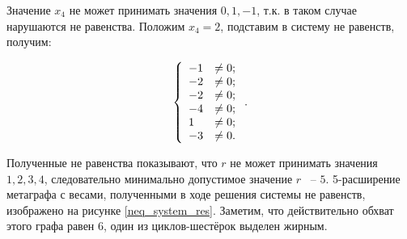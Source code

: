 \documentclass[14pt]{mmcs-article}
\begin{document}
Значение $x_4$ не может принимать значения $0, 1, -1$, т.к. в таком случае нарушаются не равенства. Положим $x_4 = 2$, подставим в систему не равенств, получим:

\begin{equation}
    \centering
    \left\{
        \begin{array}{ll}
            - 1 &\neq 0   ; \\
            - 2 &\neq 0   ; \\
            - 2 &\neq 0   ; \\
            - 4 &\neq 0   ; \\
            1 &\neq 0     ; \\
            - 3 &\neq 0   . \\
        \end{array}
    \right..
    \label{eqs:cycle_search_neqs}
\end{equation}

Полученные не равенства показывают, что $r$ не может принимать значения $1, 2, 3, 4$, следовательно минимально допустимое значение $r$ ~-- $5$. 5-расширение метаграфа с весами, полученными в ходе решения системы не равенств, изображено на рисунке \ref{neq_system_res}. Заметим, что действительно обхват этого графа равен 6, один из циклов-шестёрок выделен жирным.
\end{document}
